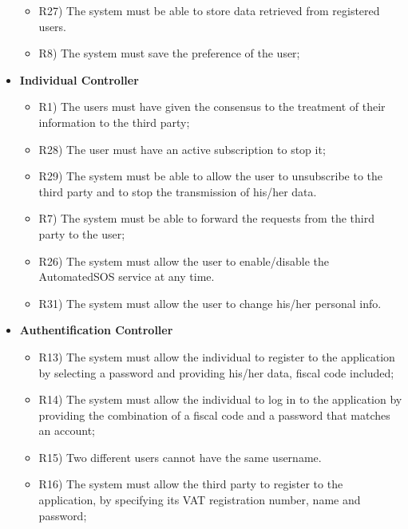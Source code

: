 \begin{itemize}
		\begin{itemize}
			\item R27) The system must be able to store data retrieved from registered users.\\
			\item R8) The system must save the preference of the user;\\
		\end{itemize}
		\item \textbf{Individual Controller}
		\begin{itemize}
			\item R1) The users must have given the consensus to the treatment of their information to the third party;\\
			\item R28) The user must have an active subscription to stop it;\\
	 		\item R29) The system must be able to allow the user to unsubscribe to the third party and to stop the transmission of his/her data.\\
	 		\item R7) The system must be able to forward the requests from the third party to the user;\\
	 		\item R26) The system must allow the user to enable/disable the AutomatedSOS service at any time.\\
			\item R31) The system must allow the user to change his/her personal info.\\
		\end{itemize}
		\item \textbf{Authentification Controller}
		\begin{itemize}
			\item R13) The system must allow the individual to register to the application by selecting a password and providing his/her data, fiscal code included;\\
			\item R14) The system must allow the individual to log in to the application by providing the combination of a fiscal code and a password that matches an account;\\
			\item R15) Two different users cannot have the same username.\\
			\item R16) The system must allow the third party to register to the application, by specifying its VAT registration number, name and password;\\

\end{itemize}
\end{itemize}
